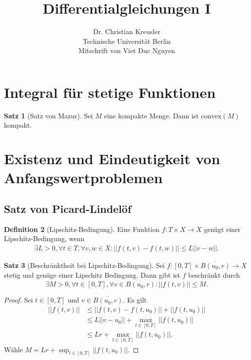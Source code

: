 \documentclass[a4paper]{article}
\theoremstyle{definition}
\newtheorem{theorem}{Satz}
\newtheorem{definition}[theorem]{Definition}
\begin{document}
\title{Differentialgleichungen I}
\author{Dr. Christian Kreusler \\ Technische Universität Berlin \\ Mitschrift von Viet Duc Nguyen}
\maketitle
\newpage
\tableofcontents
\newpage

\section{Integral für stetige Funktionen}

\begin{theorem}[Satz von Mazur]\label{theorem:mazur}
Sei $M$ eine kompakte Menge. Dann ist $\overline{\mathrm{convex}(M)}$ kompakt.
\end{theorem}

\section{Existenz und Eindeutigkeit von Anfangswertproblemen}

\subsection{Satz von Picard-Lindelöf}

\begin{definition}[Lipschitz-Bedingung]
    Eine Funktion $f: T \times X \to X$ genügt einer Lipschitz-Bedingung, wenn 
    \begin{align*}
        \exists L > 0, \forall t \in T, \forall v,w \in X: ||f(t,v) - f(t,w)|| \leq L||v - w||.
    \end{align*}
\end{definition}

\begin{theorem}[Beschränktheit bei Lipschitz-Bedingung]
\label{theorem:lipschitz_bounded}
Sei $f:[0,T] \times \overline{B(u_0,r)} \to X$ stetig und genüge einer Lipschitz Bedingung. Dann gibt ist $f$ beschränkt durch
\[
    \exists M > 0, \forall t\in [0,T],  \forall v \in \overline{B(u_0,r)}: ||f(t,v)|| \leq M.
\]
\end{theorem}
\begin{proof}
Sei $t \in [0,T]$ und $v \in \overline{B(u_0,r)}$. Es gilt
\begin{align*}
    ||f(t,v)|| &\leq ||f(t,v) - f(t,u_0)|| + ||f(t,u_0)|| \\
    &\leq L||v-u_0|| + \max_{t \in [0,T]} ||f(t,u_0)|| \\ 
    &\leq Lr + \max_{t \in [0,T]} ||f(t,u_0)||.
\end{align*}
Wähle $M = Lr + \sup_{t \in [0,T]} ||f(t,u_0)||$. 
\end{proof}
\end{document}

